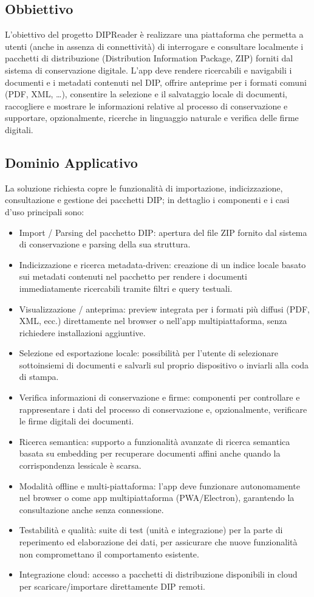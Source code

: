 \documentclass[a4paper,12pt]{article}
\begin{document}
    \subsection{Obbiettivo}
    L’obiettivo del progetto DIPReader è realizzare una piattaforma che permetta a utenti (anche in assenza di connettività) di interrogare e consultare localmente i pacchetti di distribuzione (Distribution Information Package, ZIP) forniti dal sistema di conservazione digitale. L’app deve rendere ricercabili e navigabili i documenti e i metadati contenuti nel DIP, offrire anteprime per i formati comuni (PDF, XML, …), consentire la selezione e il salvataggio locale di documenti, raccogliere e mostrare le informazioni relative al processo di conservazione e supportare, opzionalmente, ricerche in linguaggio naturale e verifica delle firme digitali.
    \subsection{Dominio Applicativo}
    La soluzione richiesta copre le funzionalità di importazione, indicizzazione, consultazione e gestione dei pacchetti DIP; in dettaglio i componenti e i casi d’uso principali sono:
    \begin{itemize}
        \item Import / Parsing del pacchetto DIP: apertura del file ZIP fornito dal sistema di conservazione e parsing della sua struttura. 
        \item Indicizzazione e ricerca metadata-driven: creazione di un indice locale basato sui metadati contenuti nel pacchetto per rendere i documenti immediatamente ricercabili tramite filtri e query testuali. 
        \item Visualizzazione / anteprima: preview integrata per i formati più diffusi (PDF, XML, ecc.) direttamente nel browser o nell’app multipiattaforma, senza richiedere installazioni aggiuntive. 
        \item Selezione ed esportazione locale: possibilità per l’utente di selezionare sottoinsiemi di documenti e salvarli sul proprio dispositivo o inviarli alla coda di stampa. 
        \item Verifica informazioni di conservazione e firme: componenti per controllare e rappresentare i dati del processo di conservazione e, opzionalmente, verificare le firme digitali dei documenti. 
        \item Ricerca semantica: supporto a funzionalità avanzate di ricerca semantica basata su embedding per recuperare documenti affini anche quando la corrispondenza lessicale è scarsa. 
        \item Modalità offline e multi-piattaforma: l’app deve funzionare autonomamente nel browser o come app multipiattaforma (PWA/Electron), garantendo la consultazione anche senza connessione. 
        \item Testabilità e qualità: suite di test (unità e integrazione) per la parte di reperimento ed elaborazione dei dati, per assicurare che nuove funzionalità non compromettano il comportamento esistente. 
        \item Integrazione cloud: accesso a pacchetti di distribuzione disponibili in cloud per scaricare/importare direttamente DIP remoti.
    \end{itemize}
\end{document}
